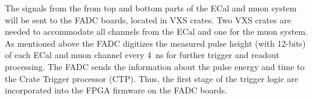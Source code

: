




The signals from the from top and bottom parts of the ECal and muon system will be sent to the FADC boards, located in VXS crates. Two VXS crates are needed to accommodate all channels from the ECal and one for the muon system. 
As mentioned above the FADC digitizes the measured pulse height (with 12-bits) of each ECal and muon channel every 4~ns for further trigger and readout processing. The FADC sends the information about the pulse energy and time to the Crate Trigger processor (CTP). Thus, the first stage of the trigger logic are incorporated into the FPGA firmware on the FADC boards. 

